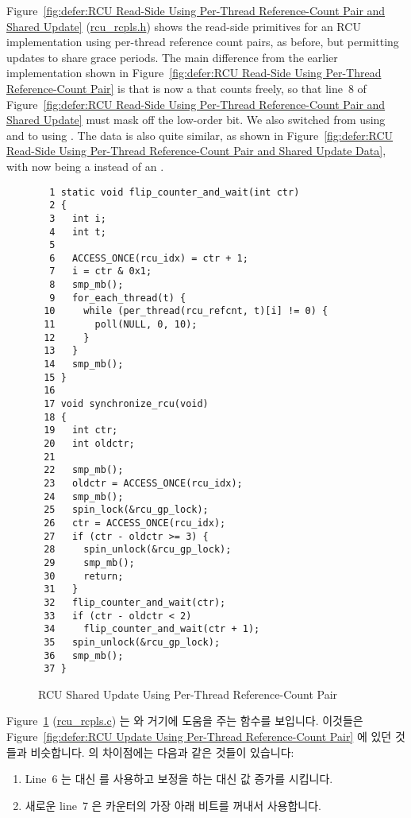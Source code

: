 Figure~\ref{fig:defer:RCU Read-Side Using Per-Thread Reference-Count Pair and Shared Update}
(\url{rcu_rcpls.h})
shows the read-side primitives for an RCU implementation using per-thread
reference count pairs, as before, but permitting updates to share
grace periods.
The main difference from the earlier implementation shown in
Figure~\ref{fig:defer:RCU Read-Side Using Per-Thread Reference-Count Pair}
is that  is now a  that counts freely,
so that line~8 of
Figure~\ref{fig:defer:RCU Read-Side Using Per-Thread Reference-Count Pair and Shared Update}
must mask off the low-order bit.
We also switched from using  and 
to using .
The data is also quite similar, as shown in
Figure~\ref{fig:defer:RCU Read-Side Using Per-Thread Reference-Count Pair and Shared Update Data},
with  now being a  instead of an
.
\fi

\begin{figure}[tbp]
{ \scriptsize
\begin{verbatim}
  1 static void flip_counter_and_wait(int ctr)
  2 {
  3   int i;
  4   int t;
  5
  6   ACCESS_ONCE(rcu_idx) = ctr + 1;
  7   i = ctr & 0x1;
  8   smp_mb();
  9   for_each_thread(t) {
 10     while (per_thread(rcu_refcnt, t)[i] != 0) {
 11       poll(NULL, 0, 10);
 12     }
 13   }
 14   smp_mb();
 15 }
 16
 17 void synchronize_rcu(void)
 18 {
 19   int ctr;
 20   int oldctr;
 21
 22   smp_mb();
 23   oldctr = ACCESS_ONCE(rcu_idx);
 24   smp_mb();
 25   spin_lock(&rcu_gp_lock);
 26   ctr = ACCESS_ONCE(rcu_idx);
 27   if (ctr - oldctr >= 3) {
 28     spin_unlock(&rcu_gp_lock);
 29     smp_mb();
 30     return;
 31   }
 32   flip_counter_and_wait(ctr);
 33   if (ctr - oldctr < 2)
 34     flip_counter_and_wait(ctr + 1);
 35   spin_unlock(&rcu_gp_lock);
 36   smp_mb();
 37 }
\end{verbatim}
}
\caption{RCU Shared Update Using Per-Thread Reference-Count Pair}
\label{fig:defer:RCU Shared Update Using Per-Thread Reference-Count Pair}
\end{figure}

Figure~\ref{fig:defer:RCU Shared Update Using Per-Thread Reference-Count Pair}
(\url{rcu_rcpls.c})
는  와 거기에 도움을 주는 
함수를 보입니다.
이것들은
Figure~\ref{fig:defer:RCU Update Using Per-Thread Reference-Count Pair} 에 있던
것들과 비슷합니다.
 의 차이점에는 다음과 같은 것들이 있습니다:
\begin{enumerate}
\item	Line~6 는  대신  를 사용하고 보정을
	하는 대신 값 증가를 시킵니다.
\item	새로운 line~7 은 카운터의 가장 아래 비트를 꺼내서 사용합니다.
\end{enumerate}
\iffalse

